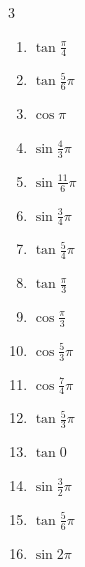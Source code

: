 \begin{multicols}{3}
\begin{enumerate}
  \item $\displaystyle \tan{\frac{\pi}{4}}$
        \phantom{$\displaystyle =1$}

  \item $\displaystyle \tan{\frac{5}{6}\pi}$

  \item $\displaystyle \cos{\pi}$
        \phantom{$\displaystyle =-1$}

  \item $\displaystyle \sin{\frac{4}{3}\pi}$

  \item $\displaystyle \sin{\frac{11}{6}\pi}$

  \item $\displaystyle \sin{\frac{3}{4}\pi}$

  \item $\displaystyle \tan{\frac{5}{4}\pi}$
        \phantom{$\displaystyle =1$}

  \item $\displaystyle \tan{\frac{\pi}{3}}$

  \item $\displaystyle \cos{\frac{\pi}{3}}$

  \item $\displaystyle \cos{\frac{5}{3}\pi}$

  \item $\displaystyle \cos{\frac{7}{4}\pi}$

  \item $\displaystyle \tan{\frac{5}{3}\pi}$

  \item $\displaystyle \tan{0}$
        \phantom{$\displaystyle =0$}

  \item $\displaystyle \sin{\frac{3}{2}\pi}$
        \phantom{$\displaystyle =-1$}

  \item $\displaystyle \tan{\frac{5}{6}\pi}$

  \item $\displaystyle \sin{2\pi}$
        \phantom{$\displaystyle =0$}


\end{enumerate}
\end{multicols}
